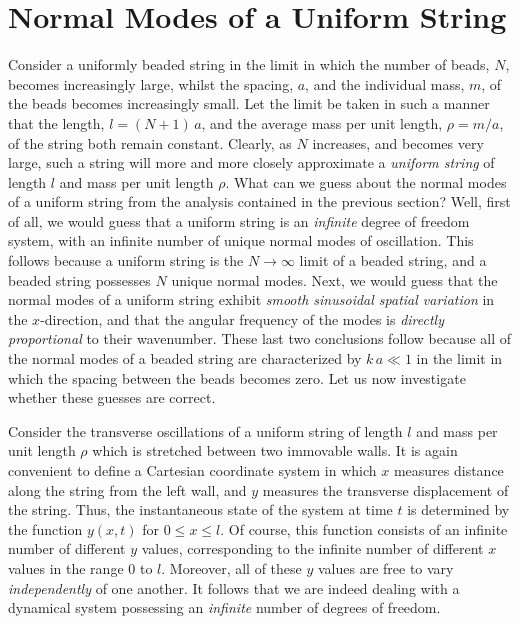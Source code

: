 \section{Normal Modes of a Uniform String}\label{s5.2}
Consider a uniformly beaded string in the limit in which the number of beads, $N$,
becomes increasingly large, whilst the spacing, $a$, and the individual mass, $m$, of the beads becomes increasingly small.  Let the
limit be  taken in such 
a manner that the length, $l=(N+1)\,a$, and the average mass per unit length, $\rho=m/a$, 
of the string both remain constant. Clearly, as $N$ increases, and becomes very large, such a string will more and
more closely approximate a {\em uniform string}\/ of length $l$ and
mass per unit length $\rho$. What can we guess about the normal modes of
a uniform string from the analysis contained in the previous section? Well, first of all,
we would guess that a uniform string is an {\em infinite}\/ degree of freedom system,
with an infinite number of unique normal modes of oscillation. This follows because a uniform string is the $N\rightarrow\infty$ limit of a beaded string, and
a beaded string possesses $N$ unique normal modes.   Next, we  would
guess that the normal modes of a uniform string exhibit {\em smooth sinusoidal spatial variation}\/ in the $x$-direction, and that the angular frequency of the modes is {\em directly proportional}\/ to
their wavenumber. These last two conclusions follow because all of the normal modes of a beaded string are characterized by $k\,a\ll 1$ in the limit in which the spacing between the beads becomes zero. Let us now investigate whether these guesses are correct.

Consider the transverse oscillations of a uniform string of length $l$ and mass
per unit length $\rho$ which is stretched between two immovable walls.  
It is again convenient to define a Cartesian coordinate system in which $x$
measures distance along the string from the left  wall, and $y$ measures
the transverse displacement of the string. Thus, the instantaneous state of the
system at time $t$ is determined by the function $y(x,t)$ for $0\leq x\leq l$. 
Of course, this function consists of an infinite number of different $y$ values,
corresponding to the infinite number of different $x$ values in the range $0$ to $l$.
Moreover, all of these $y$ values are free to vary {\em independently}\/ of one another.
It follows that we are indeed dealing with a dynamical system possessing an {\em infinite}\/ number
of degrees of freedom.

